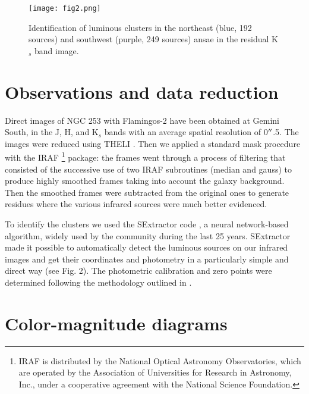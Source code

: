 \documentclass[baaa]{baaa}
\begin{document}
\begin{figure}[!t]
\centering
\texttt{[image: fig2.png]}
\caption{Identification of luminous clusters in the northeast (blue, 192 sources) and southwest (purple, 249 sources) ansae in the residual K$_{s}$ band image.}
\label{Figura}
\end{figure}

\section{Observations and data reduction}

Direct images of NGC 253 with Flamingos-2 \citep{Eikenberry2008,2013BAAA...56..457D} have been obtained at Gemini South, in the J, H, and K$_{s}$ bands with an average spatial resolution of 0$\hbox{$^{\prime\prime}$}$.5. The images were reduced using THELI \citep{2013ApJS..209...21S}. Then we applied a standard mask procedure with the IRAF \footnote{IRAF is distributed by the National Optical Astronomy Observatories, which are operated by the Association of Universities for Research in Astronomy, Inc., under a cooperative agreement with the National Science Foundation.} package: the frames went through a process of filtering that consisted of the successive use of two IRAF subroutines (median and gauss) to produce highly smoothed frames taking into account the galaxy background. Then the smoothed frames were subtracted from the original ones to generate residues where the various infrared sources were much better evidenced. 

To identify the clusters we used the SExtractor code \citep{1996A&AS..117..393B}, a neural network-based algorithm, widely used by the community during the last 25 years. SExtractor  made it possible to automatically detect the luminous sources on our infrared images and get their coordinates and photometry in a particularly simple and direct way (see Fig. 2). The photometric calibration and zero points were determined following the methodology outlined in \citet{2015AJ....150..139G}.

\section{Color-magnitude diagrams}
\end{document}
